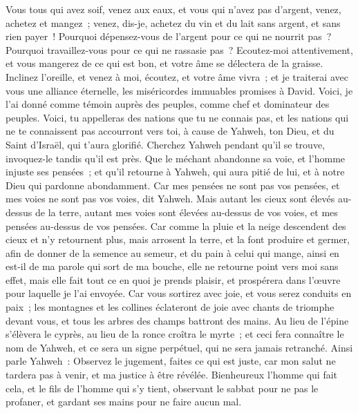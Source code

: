 \begin{multicols}{2}
\VerseOne{}Vous tous qui avez soif, venez aux eaux, et vous qui n'avez pas d'argent, venez, achetez et mangez~; venez, dis-je, achetez du vin et du lait sans argent, et sans rien payer~!
Pourquoi dépensez-vous de l'argent pour ce qui ne nourrit pas~? Pourquoi travaillez-vous pour ce qui ne rassasie pas~? Ecoutez-moi attentivement, et vous mangerez de ce qui est bon, et votre âme se délectera de la graisse.
Inclinez l'oreille, et venez à moi, écoutez, et votre âme vivra~; et je traiterai avec vous une alliance éternelle, les miséricordes immuables promises à David.
Voici, je l'ai donné comme témoin auprès des peuples, comme chef et dominateur des peuples.
Voici, tu appelleras des nations que tu ne connais pas, et les nations qui ne te connaissent pas accourront vers toi, à cause de Yahweh, ton Dieu, et du Saint d'Israël, qui t'aura glorifié.
Cherchez Yahweh pendant qu'il se trouve, invoquez-le tandis qu'il est près.
Que le méchant abandonne sa voie, et l'homme injuste ses pensées~; et qu'il retourne à Yahweh, qui aura pitié de lui, et à notre Dieu qui pardonne abondamment.
Car mes pensées ne sont pas vos pensées, et mes voies ne sont pas vos voies, dit Yahweh.
Mais autant les cieux sont élevés au-dessus de la terre, autant mes voies sont élevées au-dessus de vos voies, et mes pensées au-dessus de vos pensées.
Car comme la pluie et la neige descendent des cieux et n'y retournent plus, mais arrosent la terre, et la font produire et germer, afin de donner de la semence au semeur, et du pain à celui qui mange,
ainsi en est-il de ma parole qui sort de ma bouche, elle ne retourne point vers moi sans effet, mais elle fait tout ce en quoi je prends plaisir, et prospérera dans l'œuvre pour laquelle je l'ai envoyée.
Car vous sortirez avec joie, et vous serez conduits en paix~; les montagnes et les collines éclateront de joie avec chants de triomphe devant vous, et tous les arbres des champs battront des mains.
Au lieu de l'épine s'élèvera le cyprès, au lieu de la ronce croîtra le myrte~; et ceci fera connaître le nom de Yahweh, et ce sera un signe perpétuel, qui ne sera jamais retranché.
\VerseOne{}Ainsi parle Yahweh~: Observez le jugement, faites ce qui est juste, car mon salut ne tardera pas à venir, et ma justice à être révélée.
Bienheureux l'homme qui fait cela, et le fils de l'homme qui s'y tient, observant le sabbat pour ne pas le profaner, et gardant ses mains pour ne faire aucun mal.

\end{multicols}
